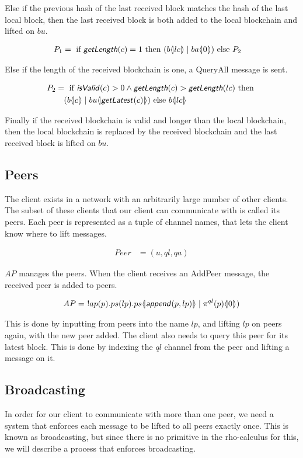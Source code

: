 Else if the previous hash of the last received block matches the hash of the last local block, then the last received block is both added to the local blockchain and lifted on $bu$.

\begin{align*}
	P_1 &=\text{ if }\text{\sffamily \textit{getLength}\normalfont}(c)=1\text{ then }(b \langle \! | lc | \! \rangle \mid ba \langle \! | 0 | \! \rangle)\text{ else }P_2
\end{align*}

Else if the length of the received blockchain is one, a QueryAll message is sent.

\begin{align*}
	P_2 &=\text{ if }\text{\sffamily \textit{isValid}\normalfont}(c) > 0 \land \text{\sffamily \textit{getLength}\normalfont}(c) > \text{\sffamily \textit{getLength}\normalfont}(lc)\text{ then }\\
	&\quad(b \langle \! | c | \! \rangle \mid bu \langle \! | \text{\sffamily \textit{getLatest}\normalfont}(c) | \! \rangle)\text{ else }b \langle \! | lc | \! \rangle
\end{align*}

Finally if the received blockchain is valid and longer than the local blockchain, then the local blockchain is replaced by the received blockchain and the last received block is lifted on $bu$.

\subsection{Peers}
The client exists in a network with an arbitrarily large number of other clients.
The subset of these clients that our client can communicate with is called its peers.
Each peer is represented as a tuple of channel names, that lets the client know where to lift messages.

\begin{align*}
    Peer &= (u, ql, qa)
\end{align*}

$AP$ manages the peers.
When the client receives an AddPeer message, the received peer is added to peers.

\begin{align*}
    AP &=\ !ap(p). ps(lp). ps \langle \! | \text{\sffamily \textit{append}\normalfont}(p,lp) | \! \rangle \mid  \pi^{ql}(p) \langle \! | 0 | \! \rangle)\\
\end{align*}

This is done by inputting from peers into the name $lp$, and lifting $lp$ on peers again, with the new peer added.
The client also needs to query this peer for its latest block.
This is done by indexing the $ql$ channel from the peer and lifting a message on it.

\subsection{Broadcasting} \label{broadcast}
In order for our client to communicate with more than one peer, we need a system that enforces each message to be lifted to all peers exactly once.
This is known as broadcasting, but since there is no primitive in the rho-calculus for this, we will describe a process that enforces broadcasting.

